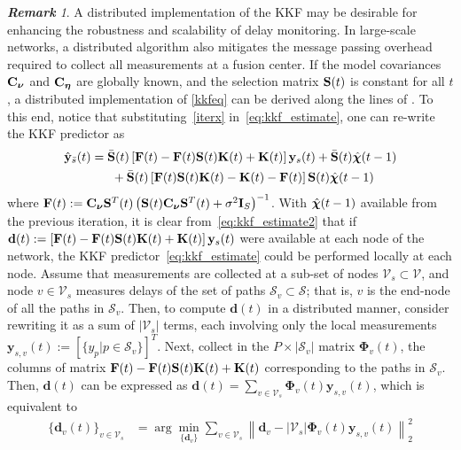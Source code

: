 \documentclass[draftcls,onecolumn,12pt]{IEEEtran}
\def \yst {{\b{y}_s(t)}}
\def \yh {{\hat{\b{y}}_{\bar{s}}}}
\def \chih {{\hat{\bs{\chi}}}}
\def \ceta {{\b{C}_{\bs{\eta}}}}
\def \cnu {{\b{C}_{\bs{\nu}}}}
\def \St {{\b{S}(t)}}
\def \Stt {{\b{S}^T(t)}}
\def \Sb {{\bar{\b{S}}(t)}}
\theoremstyle{plain}\newtheorem{thm}{Theorem}
\theoremstyle{definition}
\theoremstyle{remark}
\newtheorem{rem}{\bf Remark}
\begin{document}
\begin{rem}
A distributed implementation of the KKF may be desirable for enhancing the robustness and scalability of delay monitoring. 
In large-scale networks, a distributed algorithm also mitigates the message passing overhead required to collect all measurements at a fusion center. 
If the model covariances $\cnu$ and $\ceta$ are globally known, and the selection matrix $\St$ is constant for all $t$, a distributed implementation of \eqref{kkfeq} can be derived along the lines of \cite{tvt11}. 
{To this end, notice that substituting~\eqref{iterx} in~\eqref{eq:kkf_estimate}, one can re-write the KKF predictor as
\begin{align}\label{eq:kkf_estimate2}
\yh(t) &= \Sb\left[\b{F}(t) - \b{F}(t)\b{S}(t) \b{K}(t) + \b{K}(t) \right] \yst + \Sb \chih(t-1) \nonumber \\ 
& ~~~~~ + \Sb\left[\b{F}(t) \b{S}(t)\b{K}(t) - \b{K}(t) - \b{F}(t) \right] \b{S}(t)\chih(t-1) 
\end{align}
where $\b{F}(t) := \cnu\Stt\left(\b{S}(t)\cnu\b{S}^T(t) + \sigma^2\b{I}_S\right)^{-1}$. With $\chih(t-1)$ available from the previous iteration, it is clear from~\eqref{eq:kkf_estimate2} that if $\mathbf{d}(t):= \left[\b{F}(t) - \b{F}(t)\b{S}(t) \b{K}(t) + \b{K}(t) \right] \yst$ were available at each node of the network, the KKF predictor~\eqref{eq:kkf_estimate} could be performed locally at each node. Assume that measurements are collected at a sub-set of nodes $\mathcal{V}_s \subset \mathcal{V}$, and node $v \in \mathcal{V}_s$ measures delays of the set of paths $\mathcal{S}_v \subset \mathcal{S}$; that is, $v$ is the end-node of all the paths in $\mathcal{S}_v$. Then, to compute $\mathbf{d}(t)$ in a distributed manner, consider rewriting it as a sum of $|\mathcal{V}_s|$ terms, each involving only the local measurements $\mathbf{y}_{s,v}(t) := [\{y_p| p \in \mathcal{S}_v\}]^T$. Next, collect in the $P \times |\mathcal{S}_v|$ matrix $\mathbf{\Phi}_v(t)$, the columns of matrix $\mathbf{F}(t) - \mathbf{F}(t)\mathbf{S}(t) \mathbf{K}(t) + \mathbf{K}(t)$ corresponding to the paths in $\mathcal{S}_v$. Then, $\mathbf{d}(t)$ can be expressed as $\mathbf{d}(t) = \sum_{v \in \mathcal{V}_s} \mathbf{\Phi}_v(t)\mathbf{y}_{s,v}(t)$, which is equivalent to~\cite{SRG08} 
\begin{subequations}
\label{consensus}
\begin{align}
\{\mathbf{d}_v(t)\}_{v \in \mathcal{V}_s} &= \arg \min_{\{\mathbf{d}_v\}}  \sum_{v \in \mathcal{V}_s} \left\| \mathbf{d}_v - |\mathcal{V}_s|  \mathbf{\Phi}_v(t)\mathbf{y}_{s,v}(t) \right\|_2^2 \\

\end{align}
\end{subequations}}
\end{rem}
\end{document}
